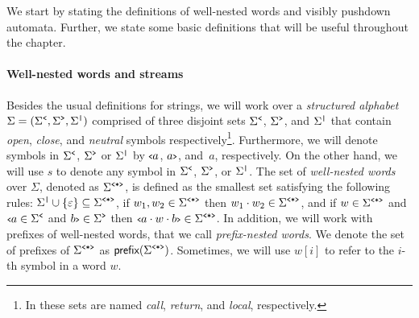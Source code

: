 
We start by stating the definitions of well-nested words and visibly pushdown automata. Further, we state some basic definitions that will be useful throughout the chapter. 

\paragraph{Well-nested words and streams} Besides the usual definitions for strings, we will work over a {\em structured alphabet} $\Sigma = (\Sigma^{\texttt{<}}, \Sigma^{\texttt{>}}, \Sigma^{\texttt{|}})$ comprised of three disjoint sets $\Sigma^{\texttt{<}}$, $\Sigma^{\texttt{>}}$, and $\Sigma^{\texttt{|}}$ that contain {\it open}, {\it close}, and {\it neutral} symbols respectively\footnote{In \cite{AlurM04,FiliotRRST18} these sets are named \emph{call}, \emph{return}, and \emph{local}, respectively.}. 
Furthermore, we will denote symbols in $\Sigma^{\texttt{<}}$, $\Sigma^{\texttt{>}}$ or $\Sigma^{\texttt{|}}$ by ${\scriptsize\texttt{<}} a$, $a{\scriptsize\texttt{>}}$, and~$a$, respectively.
On the other hand, we will use $s$ to denote any symbol in $\Sigma^{\texttt{<}}$, $\Sigma^{\texttt{>}}$, or $\Sigma^{\texttt{|}}$.
The set of {\em well-nested words}
over $\Sigma$, denoted as $\Sigma^{\texttt{<*>}}$, is defined as the smallest set satisfying the following rules: 
$\Sigma^{\texttt{|}} \cup \{\varepsilon\} \subseteq \Sigma^{\texttt{<*>}}$,
if $w_1, w_2 \in \Sigma^{\texttt{<*>}}$ then $w_1 \cdot w_2 \in \Sigma^{\texttt{<*>}}$, and if $w \in \Sigma^{\texttt{<*>}}$ and ${\scriptsize\texttt{<}} a \in \Sigma^{\texttt{<}}$ and $b{\scriptsize\texttt{>}} \in \Sigma^{\texttt{>}}$ then ${\scriptsize\texttt{<}} a\cdot w\cdot b{\scriptsize\texttt{>}} \in \Sigma^{\texttt{<*>}}$. 
In addition, we will work with prefixes of well-nested words, that we call {\em prefix-nested words}. We denote the set of prefixes of $\Sigma^{\texttt{<*>}}$ as $\textsf{prefix}(\Sigma^{\texttt{<*>}})$.
Sometimes, we will use $w[i]$ to refer to the $i$-th symbol in a word $w$.

